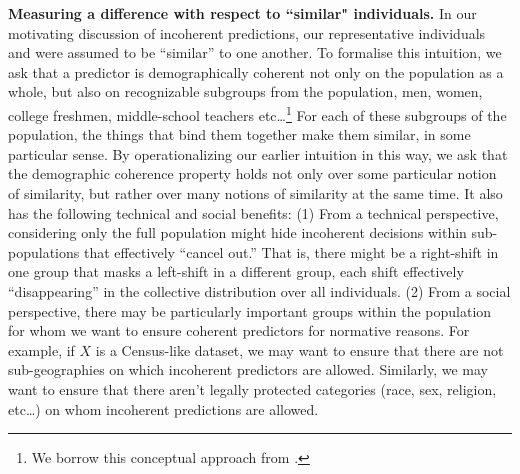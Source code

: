 \medskip
\noindent
\textbf{Measuring a difference with respect to ``similar" individuals.}     
In our motivating discussion of incoherent predictions, our representative individuals \examplenameone and \examplenametwo were assumed to be ``similar'' to one another. 
To formalise this intuition, 
we ask that a predictor is demographically coherent not only on the population as a whole, but also on recognizable subgroups from the population, \eg men, women, college freshmen, middle-school teachers etc\ldots\footnote{We borrow this conceptual approach from \cite{Hebert-JohnsonK18}.} For each of these subgroups of the population, the things that bind them together make them similar, in some particular sense. 
By operationalizing our earlier intuition in this way, we ask that the demographic coherence property holds not only over some particular notion of similarity, but rather over many notions of similarity at the same time. It also has the following technical and social benefits: (1) From a technical perspective, considering only the full population might hide incoherent decisions within sub-populations that effectively ``cancel out.'' That is, there might be a right-shift in one group that masks a left-shift in a different group, each shift effectively ``disappearing'' in the collective distribution over all individuals.  (2) From a social perspective, there may be particularly important groups within the population for whom we want to ensure coherent predictors for normative reasons. For example, if $X$ is a Census-like dataset, we may want to ensure that there are not sub-geographies on which incoherent predictors are allowed. Similarly, we may want to ensure that there aren't legally protected categories (\eg race, sex, religion, etc\ldots) on whom incoherent predictions are allowed. 


